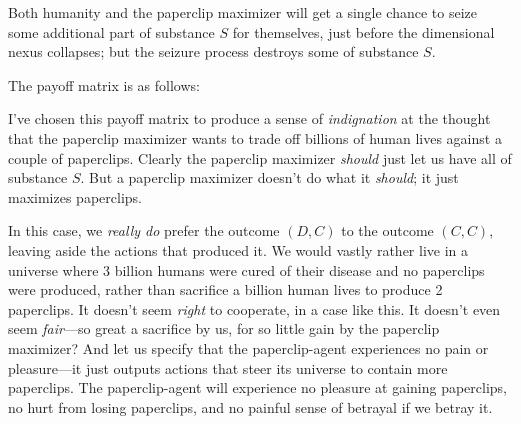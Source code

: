  Both humanity and the paperclip maximizer will get a single chance
to seize some additional part of substance $S$ for themselves, just
before the dimensional nexus collapses; but the seizure process
destroys some of substance $S$.


 The payoff matrix is as follows:

\begin{center}
\end{center}


 I've chosen this
payoff matrix to produce a sense of \textit{indignation} at the thought
that the paperclip maximizer wants to trade off billions of human lives
against a couple of paperclips. Clearly the paperclip maximizer
\textit{should} just let us have all of substance $S$. But a paperclip
maximizer doesn't do what it \textit{should}; it just
maximizes paperclips.


 In this case, we \textit{really do} prefer the outcome $(D,C)$ to
the outcome $(C,C)$, leaving aside the actions that produced it. We would
vastly rather live in a universe where 3 billion humans were cured of
their disease and no paperclips were produced, rather than sacrifice a
billion human lives to produce 2 paperclips. It doesn't
seem \textit{right} to cooperate, in a case like this. It
doesn't even seem \textit{fair}{}---so great a
sacrifice by us, for so little gain by the paperclip maximizer? And let
us specify that the paperclip-agent experiences no pain or
pleasure---it just outputs actions that steer its universe to contain
more paperclips. The paperclip-agent will experience no pleasure at
gaining paperclips, no hurt from losing paperclips, and no painful
sense of betrayal if we betray it.


